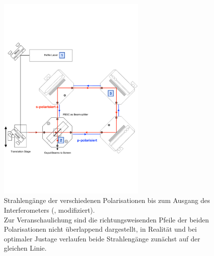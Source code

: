 \begin{figure}[h!]
  \centering
  \includegraphics[width=0.65\textwidth]{content/images/interferometer_2.pdf}
  \caption{Strahlengänge der verschiedenen Polarisationen bis zum Ausgang des Interferometers (\cite{teachspin}, modifiziert).\\
  \small{Zur Veranschaulichung sind die richtungsweisenden Pfeile der beiden Polarisationen nicht überlappend dargestellt, in Realität und bei optimaler Justage verlaufen beide Strahlengänge zunächst auf der gleichen Linie.}}
  \label{fig:int_mirr}
\end{figure}

